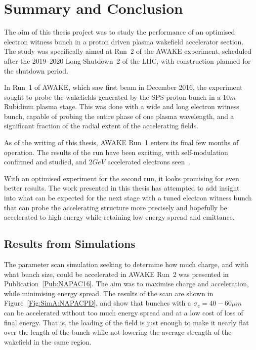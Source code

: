 %
%

\chapter{Summary and Conclusion}
\label{Ch:SnC}

The aim of this thesis project was to study the performance of an optimised electron witness bunch in a proton driven plasma wakefield accelerator section.
The study was specifically aimed at Run~2 of the AWAKE experiment, scheduled after the 2019--2020 Long Shutdown~2 of the LHC, with construction planned for the shutdown period.

In Run~1 of AWAKE, which saw first beam in December 2016, the experiment sought to probe the wakefields generated by the SPS proton bunch in a $10\unit{m}$ Rubidium plasma stage.
This was done with a wide and long electron witness bunch, capable of probing the entire phase of one plasma wavelength, and a significant fraction of the radial extent of the accelerating fields.

As of the writing of this thesis, AWAKE Run~1 enters its final few months of operation.
The results of the run have been exciting, with self-modulation confirmed and studied, and $2\unit{GeV}$ accelerated electrons seen~\cite{awake_collaboration:2018}.

With an optimised experiment for the second run, it looks promising for even better results.
The work presented in this thesis has attempted to add insight into what can be expected for the next stage with a tuned electron witness bunch that can probe the accelerating structure more precisely and hopefully be accelerated to high energy while retaining low energy spread and emittance.

\section{Results from Simulations}
\label{Sum:Sim}

The parameter scan simulation seeking to determine how much charge, and with what bunch size, could be accelerated in AWAKE Run~2 was presented in Publication~\ref{Pub:NAPAC16}.
The aim was to maximise charge and acceleration, while minimising energy spread.
The results of the scan are shown in Figure~\ref{Fig:SimA:NAPACPD}, and show that bunches with a $\sigma_z = 40-60\unit{\mu m}$ can be accelerated without too much energy spread and at a low cost of loss of final energy.
That is, the loading of the field is just enough to make it nearly flat over the length of the bunch while not lowering the average strength of the wakefield in the same region.

